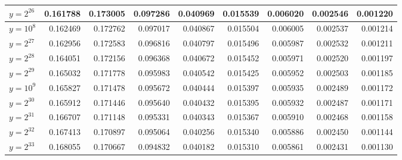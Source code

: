 \documentclass{article}
\theoremstyle{definition}
\begin{document}
\begin{table}[h!]
{\begin{tabular}{l|rrrrrrrr}
            $y = 2^{26}$             & 0.161788 & 0.173005              & 0.097286              & 0.040969              & 0.015539              & 0.006020              & 0.002546              & 0.001220              \\
            \hline
            $y = 10^{8}$             & 0.162469 & 0.172762              & 0.097017              & 0.040867              & 0.015504              & 0.006005              & 0.002537              & 0.001214              \\
            \hline
            $y = 2^{27}$             & 0.162956 & 0.172583              & 0.096816              & 0.040797              & 0.015496              & 0.005987              & 0.002532              & 0.001211              \\
            $y = 2^{28}$             & 0.164051 & 0.172156              & 0.096368              & 0.040672              & 0.015452              & 0.005971              & 0.002520              & 0.001197              \\
            $y = 2^{29}$             & 0.165032 & 0.171778              & 0.095983              & 0.040542              & 0.015425              & 0.005952              & 0.002503              & 0.001185              \\
            \hline
            $y = 10^{9}$             & 0.165827 & 0.171478              & 0.095672              & 0.040444              & 0.015397              & 0.005935              & 0.002489              & 0.001172              \\
            \hline
            $y = 2^{30}$             & 0.165912 & 0.171446              & 0.095640              & 0.040432              & 0.015395              & 0.005932              & 0.002487              & 0.001171              \\
            $y = 2^{31}$             & 0.166707 & 0.171148              & 0.095331              & 0.040343              & 0.015367              & 0.005910              & 0.002468              & 0.001158              \\
            $y = 2^{32}$             & 0.167413 & 0.170897              & 0.095064              & 0.040256              & 0.015340              & 0.005886              & 0.002450              & 0.001144              \\
            $y = 2^{33}$             & 0.168055 & 0.170667              & 0.094832              & 0.040182              & 0.015310              & 0.005861              & 0.002431              & 0.001130              \\

\end{tabular}}
\end{table}
\end{document}
